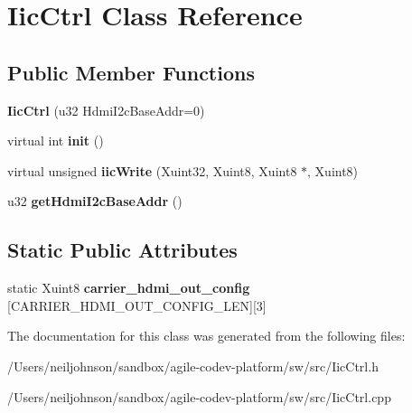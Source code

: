 \hypertarget{class_iic_ctrl}{\section{Iic\+Ctrl Class Reference}
\label{class_iic_ctrl}
}
\subsection*{Public Member Functions}
\begin{DoxyCompactItemize}
\item 
\hypertarget{class_iic_ctrl_af723bff67268b4eebcca42b0f20a352d}{{\bfseries Iic\+Ctrl} (u32 Hdmi\+I2c\+Base\+Addr=0)}\label{class_iic_ctrl_af723bff67268b4eebcca42b0f20a352d}

\item 
\hypertarget{class_iic_ctrl_a00fa06cc675dd562777bf5fd0831986a}{virtual int {\bfseries init} ()}\label{class_iic_ctrl_a00fa06cc675dd562777bf5fd0831986a}

\item 
\hypertarget{class_iic_ctrl_a86cecdf3f461a19fd77e1cdd2110a207}{virtual unsigned {\bfseries iic\+Write} (Xuint32, Xuint8, Xuint8 $\ast$, Xuint8)}\label{class_iic_ctrl_a86cecdf3f461a19fd77e1cdd2110a207}

\item 
\hypertarget{class_iic_ctrl_a297b5861772056204b83ce3f9037ea3c}{u32 {\bfseries get\+Hdmi\+I2c\+Base\+Addr} ()}\label{class_iic_ctrl_a297b5861772056204b83ce3f9037ea3c}

\end{DoxyCompactItemize}
\subsection*{Static Public Attributes}
\begin{DoxyCompactItemize}
\item 
\hypertarget{class_iic_ctrl_a14fca6591db47dd1c8f371b0cff29284}{static Xuint8 {\bfseries carrier\+\_\+hdmi\+\_\+out\+\_\+config} \mbox{[}C\+A\+R\+R\+I\+E\+R\+\_\+\+H\+D\+M\+I\+\_\+\+O\+U\+T\+\_\+\+C\+O\+N\+F\+I\+G\+\_\+\+L\+E\+N\mbox{]}\mbox{[}3\mbox{]}}\label{class_iic_ctrl_a14fca6591db47dd1c8f371b0cff29284}

\end{DoxyCompactItemize}


The documentation for this class was generated from the following files\+:\begin{DoxyCompactItemize}
\item 
/\+Users/neiljohnson/sandbox/agile-\/codev-\/platform/sw/src/Iic\+Ctrl.\+h\item 
/\+Users/neiljohnson/sandbox/agile-\/codev-\/platform/sw/src/Iic\+Ctrl.\+cpp\end{DoxyCompactItemize}
